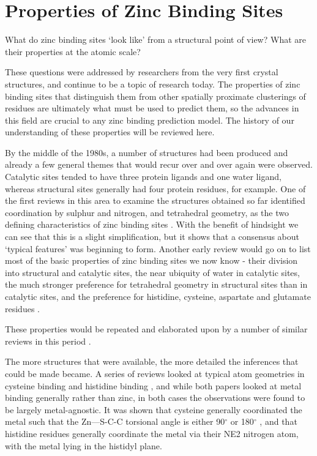 \section{Properties of Zinc Binding Sites}

What do zinc binding sites `look like' from a structural point of view? What are their properties at the atomic scale?

These questions were addressed by researchers from the very first crystal structures, and continue to be a topic of research today. The properties of zinc binding sites that distinguish them from other spatially proximate clusterings of residues are ultimately what must be used to predict them, so the advances in this field are crucial to any zinc binding prediction model. The history of our understanding of these properties will be reviewed here.

By the middle of the 1980s, a number of structures had been produced and already a few general themes that would recur over and over again were observed. Catalytic sites tended to have three protein ligands and one water ligand, whereas structural sites generally had four protein residues, for example. One of the first reviews in this area to examine the structures obtained so far identified coordination by sulphur and nitrogen, and tetrahedral geometry, as the two defining characteristics of zinc binding sites \cite{williams1987biochemistry}. With the benefit of hindsight we can see that this is a slight simplification, but it shows that a consensus about `typical features' was beginning to form. Another early review would go on to list most of the basic properties of zinc binding sites we now know - their division into structural and catalytic sites, the near ubiquity of water in catalytic sites, the much stronger preference for tetrahedral geometry in structural sites than in catalytic sites, and the preference for histidine, cysteine, aspartate and glutamate residues \cite{vallee1990zinc}.

These properties would be repeated and elaborated upon by a number of similar reviews in this period \cite{tainer1991metal,vallee1992functional,coleman1992zinc}.

The more structures that were available, the more detailed the inferences that could be made became. A series of reviews looked at typical atom geometries in cysteine binding \cite{chakrabarti1989geometry} and histidine binding \cite{chakrabarti1990geometry}, and while both papers looked at metal binding generally rather than zinc, in both cases the observations were found to be largely metal-agnostic. It was shown that cysteine generally coordinated the metal such that the Zn---S-C-C torsional angle is either 90$^\circ$ or 180$^\circ$ , and that histidine residues generally coordinate the metal via their NE2 nitrogen atom, with the metal lying in the histidyl plane.


